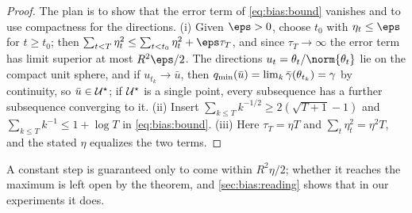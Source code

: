 \begin{refsection}

\begin{proof}
The plan is to show that the error term of \eqref{eq:bias:bound} vanishes and to use compactness for the directions. (i) Given $\eps>0$, choose $t_0$ with $\eta_t\le\eps$ for $t\ge t_0$; then $\sum_{t<T}\eta_t^2\le\sum_{t<t_0}\eta_t^2+\eps\tau_T$, and since $\tau_T\to\infty$ the error term has limit superior at most $R^2\eps/2$. The directions $u_t=\theta_t/\norm{\theta_t}$ lie on the compact unit sphere, and if $u_{t_k}\to\bar u$, then $q_{\min}(\bar u)=\lim_k\bar\gamma(\theta_{t_k})=\gamma$ by continuity, so $\bar u\in\mathcal{U}^\star$; if $\mathcal{U}^\star$ is a single point, every subsequence has a further subsequence converging to it. (ii) Insert $\sum_{k\le T}k^{-1/2}\ge2(\sqrt{T+1}-1)$ and $\sum_{k\le T}k^{-1}\le1+\log T$ in \eqref{eq:bias:bound}. (iii) Here $\tau_T=\eta T$ and $\sum_t\eta_t^2=\eta^2T$, and the stated $\eta$ equalizes the two terms.
\end{proof}

A constant step is guaranteed only to come within $R^2\eta/2$; whether it reaches the maximum is left open by the theorem, and \cref{sec:bias:reading} shows that in our experiments it does.



\end{refsection}
